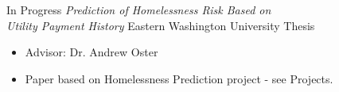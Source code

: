 \documentclass[11pt]{developercv} %
\begin{document}
\begin{entrylist}
	\entry
		{In Progress}
		{\textit{Prediction of Homelessness Risk Based on \\Utility Payment
		History}}
		{Eastern Washington University Thesis}
		{\vspace{-0.5cm}\begin{itemize}
			\item Advisor: Dr. Andrew Oster
			\item Paper based on Homelessness Prediction project - see Projects.
		\end{itemize}}
\end{entrylist}
\end{document}
